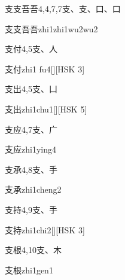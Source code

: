 \begin{Entry}{支支吾吾}{4,4,7,7}{⽀、⽀、⼝、⼝}
  \begin{Phonetics}{支支吾吾}{zhi1zhi1wu2wu2}
  \end{Phonetics}
\end{Entry}

\begin{Entry}{支付}{4,5}{⽀、⼈}
  \begin{Phonetics}{支付}{zhi1 fu4}[][HSK 3]
  \end{Phonetics}
\end{Entry}

\begin{Entry}{支出}{4,5}{⽀、⼐}
  \begin{Phonetics}{支出}{zhi1chu1}[][HSK 5]
  \end{Phonetics}
\end{Entry}

\begin{Entry}{支应}{4,7}{⽀、⼴}
  \begin{Phonetics}{支应}{zhi1ying4}
  \end{Phonetics}
\end{Entry}

\begin{Entry}{支承}{4,8}{⽀、⼿}
  \begin{Phonetics}{支承}{zhi1cheng2}
  \end{Phonetics}
\end{Entry}

\begin{Entry}{支持}{4,9}{⽀、⼿}
  \begin{Phonetics}{支持}{zhi1chi2}[][HSK 3]
  \end{Phonetics}
\end{Entry}

\begin{Entry}{支根}{4,10}{⽀、⽊}
  \begin{Phonetics}{支根}{zhi1gen1}
  \end{Phonetics}
\end{Entry}

